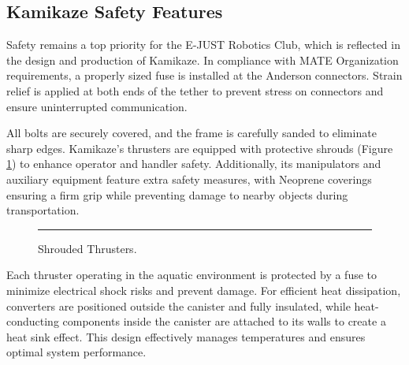 \subsection{Kamikaze Safety Features}

Safety remains a top priority for the E-JUST Robotics Club, which is reflected in the design and production of Kamikaze. In compliance with MATE Organization requirements, a properly sized fuse is installed at the Anderson connectors. Strain relief is applied at both ends of the tether to prevent stress on connectors and ensure uninterrupted communication.

All bolts are securely covered, and the frame is carefully sanded to eliminate sharp edges. Kamikaze’s thrusters are equipped with protective shrouds (Figure \ref{fig:shrouds}) to enhance operator and handler safety. Additionally, its manipulators and auxiliary equipment feature extra safety measures, with Neoprene coverings ensuring a firm grip while preventing damage to nearby objects during transportation.

\begin{figure}[h]
    \centering
    \rule{0.8\columnwidth}{4cm}
    \caption{Shrouded Thrusters.}
    \label{fig:shrouds}
\end{figure}

\vspace{-0.2cm}
Each thruster operating in the aquatic environment is protected by a fuse to minimize electrical shock risks and prevent damage. For efficient heat dissipation, converters are positioned outside the canister and fully insulated, while heat-conducting components inside the canister are attached to its walls to create a heat sink effect. This design effectively manages temperatures and ensures optimal system performance.
